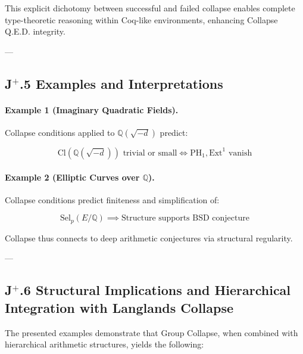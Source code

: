 \documentclass[11pt]{article}
\begin{document}
This explicit dichotomy between successful and failed collapse enables complete type-theoretic reasoning within Coq-like environments, enhancing Collapse Q.E.D. integrity.


---

\subsection*{J$^{+}$.5 Examples and Interpretations}

\paragraph{Example 1 (Imaginary Quadratic Fields).}

Collapse conditions applied to $\mathbb{Q}(\sqrt{-d})$ predict:

\[
\mathrm{Cl}(\mathbb{Q}(\sqrt{-d})) \text{ trivial or small} \iff \mathrm{PH}_1, \mathrm{Ext}^1 \text{ vanish}
\]

\paragraph{Example 2 (Elliptic Curves over $\mathbb{Q}$).}

Collapse conditions predict finiteness and simplification of:

\[
\mathrm{Sel}_p(E/\mathbb{Q}) \implies \text{Structure supports BSD conjecture}
\]

Collapse thus connects to deep arithmetic conjectures via structural regularity.

---

\subsection*{J$^{+}$.6 Structural Implications and Hierarchical Integration with Langlands Collapse}

The presented examples demonstrate that Group Collapse, when combined with hierarchical arithmetic structures, yields the following:
\end{document}
